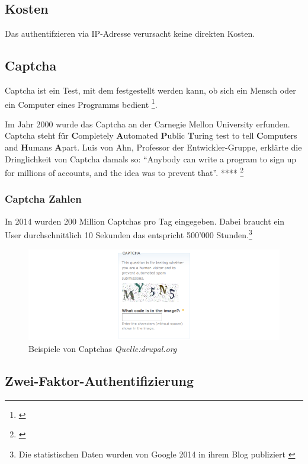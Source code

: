 \subsection{Kosten}\label{kosten-2}

Das authentifzieren via IP-Adresse verursacht keine direkten Kosten.

\subsection{Captcha}\label{captcha}

Captcha ist ein Test, mit dem festgestellt werden kann, ob sich ein
Mensch oder ein Computer eines Programms bedient \footnote{\autocite{duden}}.

Im Jahr 2000 wurde das Captcha an der Carnegie Mellon University
erfunden. Captcha steht für \textbf{C}ompletely \textbf{A}utomated
\textbf{P}ublic \textbf{T}uring test to tell \textbf{C}omputers and
\textbf{H}umans \textbf{A}part. Luis von Ahn, Professor der
Entwickler-Gruppe, erklärte die Dringlichkeit von Captcha damals so:
``Anybody can write a program to sign up for millions of accounts, and
the idea was to prevent that''. **** \footnote{\autocite{captcha}}

\subsubsection{Captcha Zahlen}\label{captcha-zahlen}

In 2014 wurden 200 Million Captchas pro Tag eingegeben. Dabei braucht
ein User durchschnittlich 10 Sekunden das entspricht 500'000
Stunden.\footnote{Die statistischen Daten wurden von Google 2014 in
  ihrem Blog publiziert \autocite{googlecaptcha}}

\begin{figure}[htbp]
\centering
\includegraphics{images/captcha.png}
\caption{Beispiele von Captchas \emph{Quelle:drupal.org}}
\end{figure}

\subsection{Zwei-Faktor-Authentifizierung}\label{zwei-faktor-authentifizierung}

